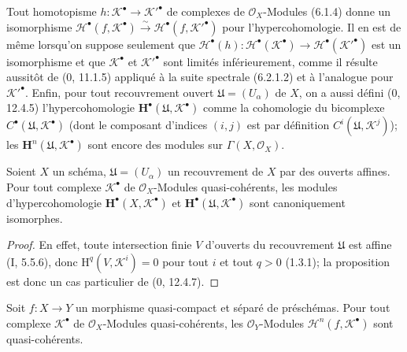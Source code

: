 \begin{env}[6.2.1]
Tout homotopisme $h:\mathscr K^\bullet\to\mathscr K'^\bullet$ de complexes de
$\mathscr O_X$-Modules (6.1.4) donne un isomorphisme
$\mathscr H^\bullet(f,\mathscr K^\bullet)\xrightarrow{\sim}
\mathscr H^\bullet(f,\mathscr K'^\bullet)$ pour l'hypercohomologie. Il en est
de même lorsqu'on suppose seulement que
$\mathscr H^\bullet(h):\mathscr H^\bullet(\mathscr K^\bullet)\to
\mathscr H^\bullet(\mathscr K'^\bullet)$ est un isomorphisme et que
$\mathscr K^\bullet$ et $\mathscr K'^\bullet$ sont limités inférieurement,
comme il résulte aussitôt de (0, 11.1.5) appliqué à la suite spectrale
(6.2.1.2) et à l'analogue pour $\mathscr K'^\bullet$. Enfin, pour tout
recouvrement ouvert $\mathfrak U=(U_\alpha)$ de $X$, on a aussi défini
(0, 12.4.5) l'hypercohomologie
$\mathbf H^\bullet(\mathfrak U,\mathscr K^\bullet)$ comme la cohomologie du
bicomplexe $C^\bullet(\mathfrak U,\mathscr K^\bullet)$ (dont le composant
d'indices $(i,j)$ est par définition
$C^i(\mathfrak U,\mathscr K^j)$); les
$\mathbf H^n(\mathfrak U,\mathscr K^\bullet)$ sont encore des modules sur
$\Gamma(X,\mathscr O_X)$.
\end{env}

\begin{proposition}[6.2.2]
Soient $X$ un schéma, $\mathfrak U=(U_\alpha)$ un recouvrement de $X$ par des
ouverts affines. Pour tout complexe $\mathscr K^\bullet$ de
$\mathscr O_X$-Modules quasi-cohérents, les modules d'hypercohomologie
$\mathbf H^\bullet(X,\mathscr K^\bullet)$ et
$\mathbf H^\bullet(\mathfrak U,\mathscr K^\bullet)$ sont canoniquement
isomorphes.
\end{proposition}

\begin{proof}
En effet, toute intersection finie $V$ d'ouverts du recouvrement
$\mathfrak U$ est affine (I, 5.5.6), donc
$\mathrm H^q(V,\mathscr K^i)=0$ pour tout $i$ et tout $q>0$ (1.3.1); la
proposition est donc un cas particulier de (0, 12.4.7).
\end{proof}

\begin{proposition}[6.2.3]
Soit $f:X\to Y$ un morphisme quasi-compact et séparé de préschémas. Pour tout
complexe $\mathscr K^\bullet$ de $\mathscr O_X$-Modules quasi-cohérents, les
$\mathscr O_Y$-Modules $\mathscr H^n(f,\mathscr K^\bullet)$ sont
quasi-cohérents.
\end{proposition}

